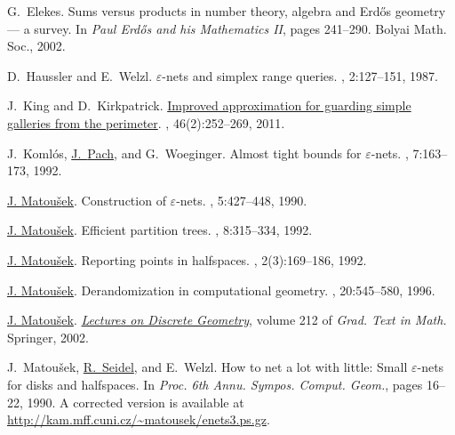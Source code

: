 \documentclass[12pt]{article}
\providecommand{\Erdos}{Erd{\H{o}}s\xspace}
\begin{document}
\begin{thebibliography}{MSW90}
G.~Elekes.
\newblock  Sums versus products in number theory, algebra and {\Erdos{}}
  geometry --- a survey.
\newblock In {\em Paul {\Erdos{}} and his Mathematics II}, pages 241--290.
  Bolyai Math. Soc., 2002.

D.~Haussler and E.~Welzl.
\newblock  $\varepsilon$-nets and simplex range queries.
, 2:127--151, 1987.

J.~King and D.~Kirkpatrick.
\newblock \href{http://dx.doi.org/10.1007/s00454-011-9352-x}{Improved
  approximation for guarding simple galleries from the perimeter}.
, 46(2):252--269, 2011.

J.~Koml{\'o}s, \href{http://www.math.nyu.edu/~pach}{J.~{Pach}}, and G.~Woeginger.
\newblock  Almost tight bounds for $\varepsilon$-nets.
, 7:163--173, 1992.

\href{http://kam.mff.cuni.cz/~matousek}{J. Matou{\v s}ek}.
\newblock  Construction of $\varepsilon$-nets.
, 5:427--448, 1990.

\href{http://kam.mff.cuni.cz/~matousek}{J. Matou{\v s}ek}.
\newblock  Efficient partition trees.
, 8:315--334, 1992.

\href{http://kam.mff.cuni.cz/~matousek}{J. Matou{\v s}ek}.
\newblock  Reporting points in halfspaces.
, 2(3):169--186, 1992.

\href{http://kam.mff.cuni.cz/~matousek}{J. Matou{\v s}ek}.
\newblock  Derandomization in computational geometry.
, 20:545--580, 1996.

\href{http://kam.mff.cuni.cz/~matousek}{J. Matou{\v s}ek}.
\newblock \href{http://kam.mff.cuni.cz/~matousek/dg.html}{{\em Lectures on
  Discrete Geometry}}, volume 212 of {\em Grad. Text in Math.}
\newblock Springer, 2002.

J.~Matou\v{s}ek, \href{http://www-tcs.cs.uni-sb.de/seidel/}{R.~{Seidel}}, and E.~Welzl.
\newblock  How to net a lot with little: {Small} {$\varepsilon$}-nets for disks
  and halfspaces.
\newblock In {\em Proc. 6th Annu. Sympos. Comput. Geom.\CNFSoCG}, pages 16--22,
  1990.
\newblock A corrected version is available at
  \url{http://kam.mff.cuni.cz/~matousek/enets3.ps.gz}.


\end{thebibliography}
\end{document}
